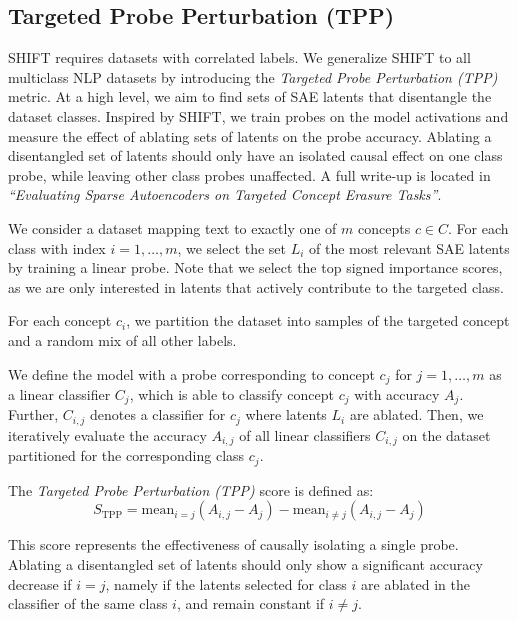 \documentclass{article}
\theoremstyle{plain}
\theoremstyle{definition}
\theoremstyle{remark}
\begin{document}
\subsection*{Targeted Probe Perturbation (TPP)}

SHIFT requires datasets with correlated labels. We generalize SHIFT to all multiclass NLP datasets by introducing the \textit{Targeted Probe Perturbation (TPP)} metric. At a high level, we aim to find sets of SAE latents that disentangle the dataset classes. Inspired by SHIFT, we train probes on the model activations and measure the effect of ablating sets of latents on the probe accuracy. Ablating a disentangled set of latents should only have an isolated causal effect on one class probe, while leaving other class probes unaffected. A full write-up is located in \textit{“Evaluating Sparse Autoencoders on Targeted Concept Erasure Tasks”}.

We consider a dataset mapping text to exactly one of $m$ concepts $c \in C$. For each class with index $i = 1, \dots, m$, we select the set $L_i$ of the most relevant SAE latents by training a linear probe. Note that we select the top signed importance scores, as we are only interested in latents that actively contribute to the targeted class.

For each concept $c_i$, we partition the dataset into samples of the targeted concept and a random mix of all other labels.

We define the model with a probe corresponding to concept $c_j$ for $j = 1, \dots, m$ as a linear classifier $C_j$, which is able to classify concept $c_j$ with accuracy $A_j$. Further, $C_{i,j}$ denotes a classifier for $c_j$ where latents $L_i$ are ablated. Then, we iteratively evaluate the accuracy $A_{i,j}$ of all linear classifiers $C_{i,j}$ on the dataset partitioned for the corresponding class $c_j$.

The \textit{Targeted Probe Perturbation (TPP)} score is defined as:
\[
S_\text{TPP} = \text{mean}_{i=j} \left( A_{i,j} - A_j \right) - \text{mean}_{i \neq j} \left( A_{i,j} - A_j \right)
\]

This score represents the effectiveness of causally isolating a single probe. Ablating a disentangled set of latents should only show a significant accuracy decrease if $i = j$, namely if the latents selected for class $i$ are ablated in the classifier of the same class $i$, and remain constant if $i \neq j$.
\end{document}
